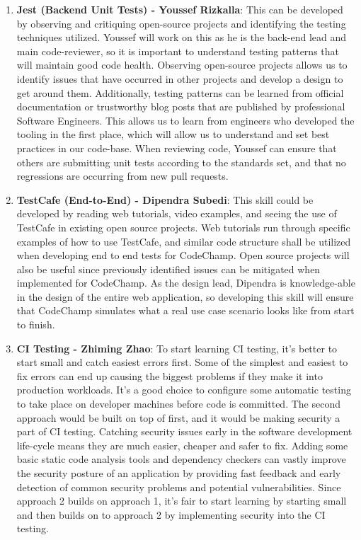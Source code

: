 \documentclass[12pt, titlepage]{article}
\begin{document}
\begin{enumerate}
\begin{enumerate}
\item \textbf{Jest (Backend Unit Tests) - Youssef Rizkalla}: This can be developed by observing and critiquing open-source projects and identifying the testing techniques utilized. Youssef will work on this as he is the back-end lead and main code-reviewer, so it is important to understand testing patterns that will maintain good code health. Observing open-source projects allows us to identify issues that have occurred in other projects and develop a design to get around them. Additionally, testing patterns can be learned from official documentation or trustworthy blog posts that are published by professional Software Engineers. This allows us to learn from engineers who developed the tooling in the first place, which will allow us to understand and set best practices in our code-base. When reviewing code, Youssef can ensure that others are submitting unit tests according to the standards set, and that no regressions are occurring from new pull requests.

\item \textbf{TestCafe (End-to-End)  - Dipendra Subedi}: This skill could be developed by reading web tutorials, video examples, and seeing the use of TestCafe in existing open source projects. Web tutorials run through specific examples of how to use TestCafe, and similar code structure shall be utilized when developing end to end tests for CodeChamp. Open source projects will also be useful since previously identified issues can be mitigated when implemented for CodeChamp. As the design lead, Dipendra is knowledge-able in the design of the entire web application, so developing this skill will ensure that CodeChamp simulates what a real use case scenario looks like from start to finish.

\item \textbf{CI Testing - Zhiming Zhao}: To start learning CI testing, it's better to start small and catch easiest errors first. Some of the simplest and easiest to fix errors can end up causing the biggest problems if they make it into production workloads. It's a good choice to configure some automatic testing to take place on developer machines before code is committed. The second approach would be built on top of first, and it would be making security a part of CI testing. Catching security issues early in the software development life-cycle means they are much easier, cheaper and safer to fix. Adding some basic static code analysis tools and dependency checkers can vastly improve the security posture of an application by providing fast feedback and early detection of common security problems and potential vulnerabilities. Since approach 2 builds on approach 1, it's fair to start learning by starting small and then builds on to approach 2 by implementing security into the CI testing. 

  \end{enumerate}
  
\end{enumerate}
\end{document}
